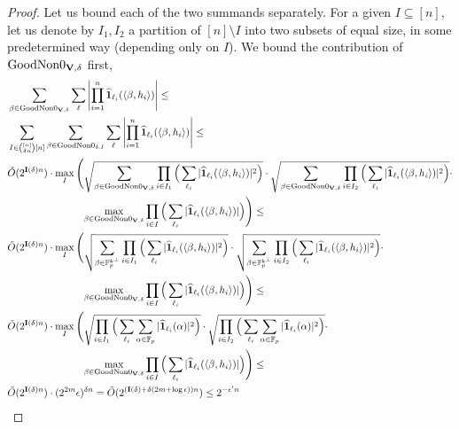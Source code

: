 \begin{proof}
Let us bound each of the two summands separately. %
For a given $I \subseteq [n]$, let us denote by $I_1,I_2$ a partition of $[n]\setminus I$ into two subsets of equal size, in some predetermined way (depending only on $I$). 
We bound the contribution of $\textnormal{GoodNon0}_{\mathbf{V},\delta}$ first,
{\allowdisplaybreaks
\begin{align}
&\sum_{\beta\in \GoodNoZero{\vec{V}}{\delta}}\sum_{\vec{\ell}}\left|\prod^n_{i=1}\widehat{\vec{1}}_{\ell_i}(\ip{\beta,h_i})\right|\leq\nonumber\\
&\sum_{I\in{\binom{[n]}{\delta n}[n]}}\sum_{\beta\in \GoodNoZero{\delta}{I}}\sum_{\vec{\ell}}\left|\prod^n_{i=1}\widehat{\vec{1}}_{\ell_i}(\ip{\beta,h_i})\right|\label{eq-CS7} \leq \\
&\tilde{O}(2^{\Ent{\delta}n}) \cdot \max_I\Bigg(\sqrt{\sum_{\beta\in \GoodNoZero{\vec{V}}{\delta}}\prod_{i\in I_1}\Big(\sum_{\ell_i}|\widehat{\vec{1}}_{\ell_i}(\ip{\beta,h_i})|^2\Big)}\cdot\sqrt{\sum_{\beta\in \GoodNoZero{\vec{V}}{\delta}}\prod_{i\in I_2}\Big(\sum_{\ell_i}|\widehat{\vec{1}}_{\ell_i}(\ip{\beta,h_i})|^2\Big)}\cdot \nonumber \\ 
& \hphantom{{}=\tilde{O}(2^{\Ent{\delta}n})\max_I}\max_{\beta\in \GoodNoZero{\vec{V}}{\delta}}\prod_{i\in I}\Big(\sum_{\ell_i}|\widehat{\vec{1}}_{\ell_i}(\ip{\beta,h_i})|\Big) \Bigg) \leq \label{eq-CS8} \\ 
&\tilde{O}(2^{\Ent{\delta}n}) \cdot \max_I\Bigg(\sqrt{\sum_{\beta\in \F^{\dualcodedim}_p}\prod_{i\in I_1}\Big(\sum_{\ell_i}|\widehat{\vec{1}}_{\ell_i}(\ip{\beta,h_i})|^2\Big)}\cdot\sqrt{\sum_{\beta\in  \F^{\dualcodedim}_p}\prod_{i\in I_2}\Big(\sum_{\ell_i}|\widehat{\vec{1}}_{\ell_i}(\ip{\beta,h_i})|^2\Big)}\cdot \nonumber\\
& \hphantom{{}=\tilde{O}(2^{\Ent{\delta}n})\max_I} \max_{\beta\in \GoodNoZero{\vec{V}}{\delta}}\prod_{i\in I}\Big(\sum_{\ell_i}|\widehat{\vec{1}}_{\ell_i}(\ip{\beta,h_i})|\Big) \Bigg)\leq \label{eq-CS11} \\
&\tilde{O}(2^{\Ent{\delta}n}) \cdot\max_I \Bigg( \sqrt{\prod_{i\in I_1}\Big(\sum_{\ell_i}\sum_{\alpha\in\F_p}|\widehat{\vec{1}}_{\ell_i}(\alpha)|^2\Big)}\cdot\sqrt{\prod_{i\in I_2}\Big(\sum_{\ell_i}\sum_{\alpha\in\F_p}|\widehat{\vec{1}}_{\ell_i}(\alpha)|^2\Big)}\cdot\nonumber\\
& \hphantom{{}=\tilde{O}(2^{\Ent{\delta}n})\max_I} \max_{\beta\in \GoodNoZero{\vec{V}}{\delta}}\prod_{i\in I}\Big(\sum_{\ell_i}|\widehat{\vec{1}}_{\ell_i}(\ip{\beta,h_i})|\Big) \Bigg) \leq\label{eq-CS9}\\
& \tilde{O}(2^{\Ent{\delta}n})\cdot(2^{2m}\epsilon)^{\delta n}=\tilde{O}(2^{(\Ent{\delta}+\delta(2m+\log{\epsilon}))n})\leq 2^{-\epsilon' n} \label{eq-eps}
\end{align}}


\end{proof}

